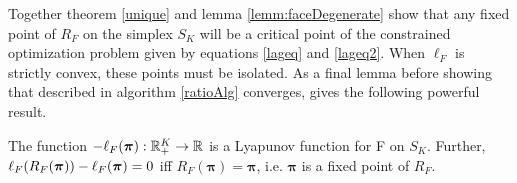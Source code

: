 Together theorem \ref{unique} and lemma \ref{lemm:faceDegenerate} show that any fixed point of \( R_F \) on the simplex \( S_K \) will be a critical point of the constrained optimization problem given by equations \eqref{lageq} and \eqref{lageq2}.  When \( \ell_{F} \) is strictly convex, these points must be isolated.
As a final lemma before showing that \DR described in algorithm \ref{ratioAlg} converges, \cite{rychlikLyapunov} gives the following powerful result.

\begin{lemm}\label{lemm:ellLyapR}
	The function \( -\elpi{F}:\R^K_{+}\rightarrow\R \) is a Lyapunov function for \Rpi F on \( S_K \). Further, \( \elpi[R_F(\bm\pi)]{F} -\elpi F = 0 \) iff \( R_F(\bm\pi) = \bm\pi \), i.e. \( \bm\pi \) is a fixed point of \( R_F \).
\end{lemm}

